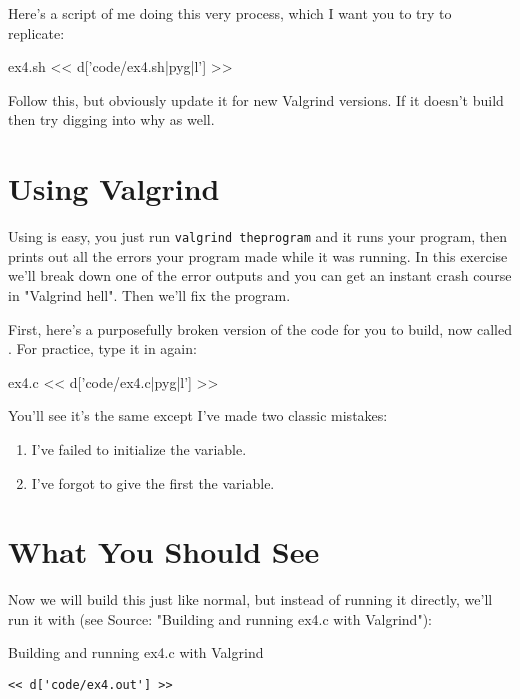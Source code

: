 Here's a script of me doing this very process, which I want you to
try to replicate:

\begin{code}{ex4.sh}
<< d['code/ex4.sh|pyg|l'] >>
\end{code}

Follow this, but obviously update it for new Valgrind versions.  If it
doesn't build then try digging into why as well.

\section{Using Valgrind}

Using  is easy, you just run \verb|valgrind theprogram| and
it runs your program, then prints out all the errors your program made while it
was running.  In this exercise we'll break down one of the error outputs and
you can get an instant crash course in "Valgrind hell".  Then we'll fix the
program.

First, here's a purposefully broken version of the  code
for you to build, now called .  For practice, type it
in again:

\begin{code}{ex4.c}
<< d['code/ex4.c|pyg|l'] >>
\end{code}

You'll see it's the same except I've made two classic mistakes:

\begin{enumerate}
\item I've failed to initialize the  variable.
\item I've forgot to give the first  the  variable.
\end{enumerate}

\section{What You Should See}

Now we will build this just like normal, but instead of running it
directly, we'll run it with  (see Source: "Building and running ex4.c with Valgrind"):

\begin{Terminal}{Building and running ex4.c with Valgrind}
\begin{lstlisting}
<< d['code/ex4.out'] >>
\end{lstlisting}
\end{Terminal}

